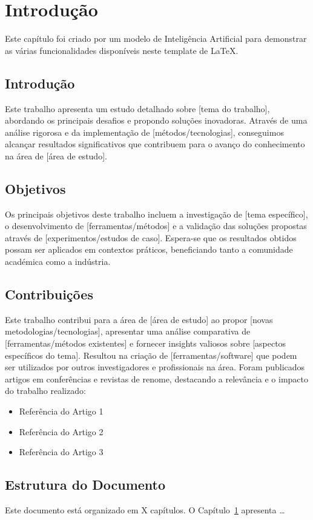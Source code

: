 \chapter{Introdução}
\label{chap:introduction}

\begin{introduction}
Este capítulo foi criado por um modelo de Inteligência Artificial para demonstrar as várias funcionalidades disponíveis neste template de \LaTeX{}.
\end{introduction}

\section{Introdução}
Este trabalho apresenta um estudo detalhado sobre [tema do trabalho], abordando os principais desafios e propondo soluções inovadoras. Através de uma análise rigorosa e da implementação de [métodos/tecnologias], conseguimos alcançar resultados significativos que contribuem para o avanço do conhecimento na área de [área de estudo].

\section{Objetivos}
Os principais objetivos deste trabalho incluem a investigação de [tema específico], o desenvolvimento de [ferramentas/métodos] e a validação das soluções propostas através de [experimentos/estudos de caso]. Espera-se que os resultados obtidos possam ser aplicados em contextos práticos, beneficiando tanto a comunidade académica como a indústria.

\section{Contribuições}
Este trabalho contribui para a área de [área de estudo] ao propor [novas metodologias/tecnologias], apresentar uma análise comparativa de [ferramentas/métodos existentes] e fornecer insights valiosos sobre [aspectos específicos do tema]. Resultou na criação de [ferramentas/software] que podem ser utilizados por outros investigadores e profissionais na área. Foram publicados artigos em conferências e revistas de renome, destacando a relevância e o impacto do trabalho realizado:
\begin{itemize}
    \item Referência do Artigo 1
    \item Referência do Artigo 2
    \item Referência do Artigo 3
\end{itemize}

\section{Estrutura do Documento}
Este documento está organizado em X capítulos. O Capítulo~\ref{chap:introduction} apresenta \ldots



